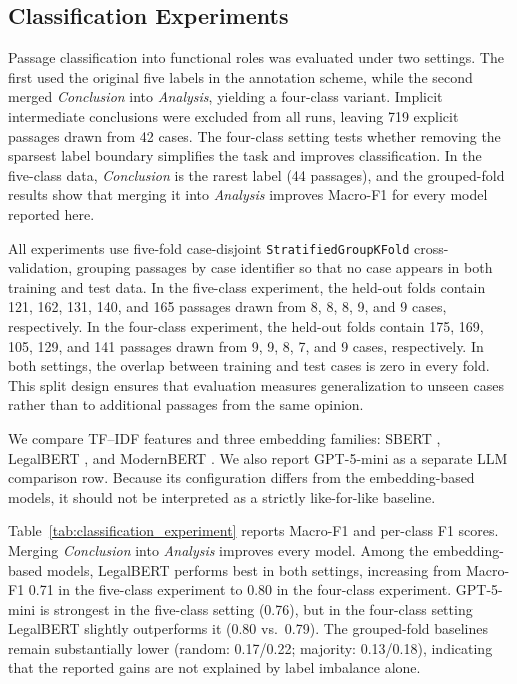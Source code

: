 \subsection{Classification Experiments}



Passage classification into functional roles was evaluated under two settings. The first used the original five labels in the annotation scheme, while the second merged \textit{Conclusion} into \textit{Analysis}, yielding a four-class variant. Implicit intermediate conclusions were excluded from all runs, leaving 719 explicit passages drawn from 42 cases. The four-class setting tests whether removing the sparsest label boundary simplifies the task and improves classification. In the five-class data, \textit{Conclusion} is the rarest label (44 passages), and the grouped-fold results show that merging it into \textit{Analysis} improves Macro-F1 for every model reported here.

All experiments use five-fold case-disjoint \texttt{StratifiedGroupKFold} cross-validation, grouping passages by case identifier so that no case appears in both training and test data. In the five-class experiment, the held-out folds contain 121, 162, 131, 140, and 165 passages drawn from 8, 8, 8, 9, and 9 cases, respectively. In the four-class experiment, the held-out folds contain 175, 169, 105, 129, and 141 passages drawn from 9, 9, 8, 7, and 9 cases, respectively. In both settings, the overlap between training and test cases is zero in every fold. This split design ensures that evaluation measures generalization to unseen cases rather than to additional passages from the same opinion.

We compare TF--IDF features and three embedding families: SBERT \citep{reimers2019sentencebertsentenceembeddingsusing}, LegalBERT \citep{chalkidis-etal-2020-legal}, and ModernBERT \citep{warner-etal-2025-smarter}. We also report GPT-5-mini as a separate LLM comparison row. Because its configuration differs from the embedding-based models, it should not be interpreted as a strictly like-for-like baseline.

Table~\ref{tab:classification_experiment} reports Macro-F1 and per-class F1 scores. Merging \textit{Conclusion} into \textit{Analysis} improves every model. Among the embedding-based models, LegalBERT performs best in both settings, increasing from Macro-F1 0.71 in the five-class experiment to 0.80 in the four-class experiment. GPT-5-mini is strongest in the five-class setting (0.76), but in the four-class setting LegalBERT slightly outperforms it (0.80 vs.\ 0.79). The grouped-fold baselines remain substantially lower (random: 0.17/0.22; majority: 0.13/0.18), indicating that the reported gains are not explained by label imbalance alone.

